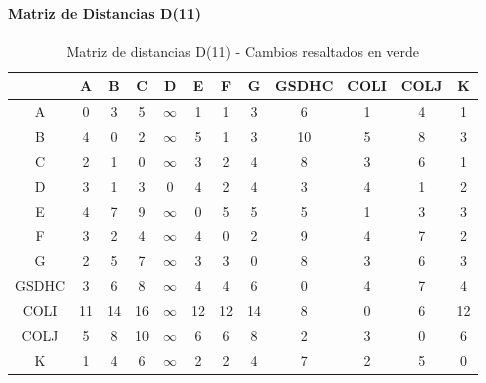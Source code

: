 \documentclass[12pt]{article}
\begin{document}
\paragraph{Matriz de Distancias D(11)}
\begin{table}[h!]
\centering
\begin{tabular}{|c|c|c|c|c|c|c|c|c|c|c|c|}
\hline
 & A & B & C & D & E & F & G & GSDHC & COLI & COLJ & K \\\hline
A & 0 & 3 & 5 & $\infty$ & 1 & 1 & 3 & 6 & 1 & 4 & 1 \\\hline
B & \cellcolor{lightgreen} 4 & 0 & 2 & $\infty$ & \cellcolor{lightgreen} 5 & 1 & 3 & \cellcolor{lightgreen} 10 & \cellcolor{lightgreen} 5 & \cellcolor{lightgreen} 8 & 3 \\\hline
C & \cellcolor{lightgreen} 2 & 1 & 0 & $\infty$ & \cellcolor{lightgreen} 3 & 2 & 4 & \cellcolor{lightgreen} 8 & \cellcolor{lightgreen} 3 & \cellcolor{lightgreen} 6 & 1 \\\hline
D & \cellcolor{lightgreen} 3 & 1 & 3 & 0 & \cellcolor{lightgreen} 4 & 2 & 4 & 3 & 4 & 1 & 2 \\\hline
E & \cellcolor{lightgreen} 4 & \cellcolor{lightgreen} 7 & \cellcolor{lightgreen} 9 & $\infty$ & 0 & \cellcolor{lightgreen} 5 & 5 & 5 & 1 & 3 & 3 \\\hline
F & \cellcolor{lightgreen} 3 & 2 & 4 & $\infty$ & \cellcolor{lightgreen} 4 & 0 & 2 & \cellcolor{lightgreen} 9 & \cellcolor{lightgreen} 4 & \cellcolor{lightgreen} 7 & 2 \\\hline
G & 2 & 5 & 7 & $\infty$ & 3 & 3 & 0 & 8 & 3 & 6 & 3 \\\hline
GSDHC & 3 & 6 & 8 & $\infty$ & 4 & 4 & 6 & 0 & 4 & 7 & 4 \\\hline
COLI & 11 & 14 & 16 & $\infty$ & 12 & 12 & 14 & 8 & 0 & 6 & 12 \\\hline
COLJ & 5 & 8 & 10 & $\infty$ & 6 & 6 & 8 & 2 & 3 & 0 & 6 \\\hline
K & 1 & 4 & 6 & $\infty$ & 2 & 2 & 4 & 7 & 2 & 5 & 0 \\\hline
\end{tabular}
\caption{Matriz de distancias D(11) - Cambios resaltados en verde}
\end{table}
\end{document}
